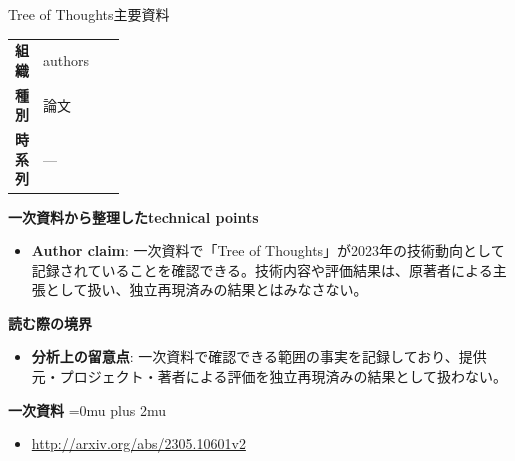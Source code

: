 \begin{technicalnote}{Tree of Thoughts}{主要資料}
\begingroup
\begin{tabularx}{\linewidth}{@{}>{\bfseries}p{0.22\linewidth}X@{}}
組織 & authors \\
種別 & 論文 \\
時系列 & — \\
\end{tabularx}
\smallskip
{\bfseries 一次資料から整理したtechnical points}
\begin{itemize}[leftmargin=1.5em,itemsep=0.35em]
\item \textbf{Author claim}: 一次資料で「Tree of Thoughts」が2023年の技術動向として記録されていることを確認できる。技術内容や評価結果は、原著者による主張として扱い、独立再現済みの結果とはみなさない。
\end{itemize}
\begin{minipage}{\linewidth}
{\bfseries 読む際の境界}
\begin{itemize}[leftmargin=1.5em,itemsep=0.35em]
\item \textbf{分析上の留意点}: 一次資料で確認できる範囲の事実を記録しており、提供元・プロジェクト・著者による評価を独立再現済みの結果として扱わない。
\end{itemize}
\begin{samepage}
{\bfseries 一次資料}
\begingroup\sloppy
\Urlmuskip=0mu plus 2mu\relax
\begin{itemize}[leftmargin=1.5em,itemsep=0.25em]
\item {\scriptsize\url{http://arxiv.org/abs/2305.10601v2}}
\end{itemize}
\endgroup
\end{samepage}
\end{minipage}
\endgroup
\end{technicalnote}
\medskip

